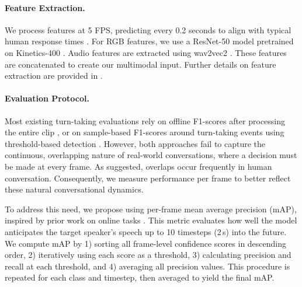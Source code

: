 \paragraph{Feature Extraction.} \label{para:feature_extraction}
We process features at 5 FPS, predicting every 0.2 seconds to align with typical human response times \cite{skantze2021turnreview}. For RGB features, we use a ResNet-50 \cite{he2016resnet} model pretrained on Kinetics-400 \cite{kay2017kinetics}. Audio features are extracted using wav2vec2 \cite{baevski2020wav2vec}. These features are concatenated to create our multimodal input. Further details on feature extraction are provided in .

\paragraph{Evaluation Protocol.}

Most existing turn-taking evaluations rely on offline F1-scores after processing the entire clip \cite{lee2023multimodal, kurata2023multimodal}, or on sample-based F1-scores around turn-taking events using threshold-based detection \cite{ekstedt2022voice, onishi2023multimodalvap}. However, both approaches fail to capture the continuous, overlapping nature of real-world conversations, where a decision must be made at every frame. As \citet{heldner2010pauses} suggested, overlaps occur frequently in human conversation. Consequently, we measure performance per frame to better reflect these natural conversational dynamics.

To address this need, we propose using per-frame mean average precision (mAP), inspired by 
prior work on online tasks \cite{de2016online}. This metric evaluates how well the model 
anticipates the target speaker’s speech up to 10 timesteps (2\,s) into the future. We compute mAP by 1) sorting all frame-level confidence scores in descending order, 2) iteratively using each score as a threshold, 3) calculating precision and recall at each threshold, and 4) averaging all precision values. This procedure is repeated for each class and timestep, then averaged to yield the final mAP.





